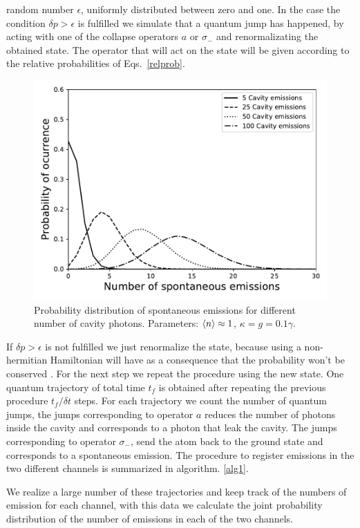 \documentclass[%
 reprint,
 amsmath,amssymb,
 aps, 
]{revtex4-1}
\begin{document}
random number $\epsilon$, uniformly distributed between zero and one.
In the case the condition $\delta p > \epsilon$ is fulfilled we
simulate that a quantum jump has happened, by acting with one of the
collapse operators $a$ or $\sigma_-$ and renormalizating the obtained
state. The operator that will act on the state will be given according
to the relative probabilities of Eqs.~\eqref{relprob}.
\begin{figure}[!t] 
\centering
\includegraphics[scale = 0.5]{distributioneng.pdf}
\caption{Probability distribution of spontaneous emissions for
  different number of cavity photons. Parameters: $\expval{n} \approx 1$, $\kappa = g = 0.1\gamma$. } \label{probdiss}
\end{figure}
If $\delta p > \epsilon$ is not fulfilled we just renormalize the
state, because using a non-hermitian Hamiltonian will have as a
consequence that the probability won't be conserved
\cite{Sakurai:1167961}. For the next step we repeat the procedure
using the new state. One quantum trajectory of total time $t_f$ is
obtained after repeating the previous procedure $t_f/\delta t$ steps.
For each trajectory we count the number of quantum jumps, the jumps
corresponding to operator $a$ reduces the number of photons inside the
cavity and corresponds to a photon that leak the cavity. The jumps
corresponding to operator $\sigma_-$, send the atom back to the ground
state and corresponds to a spontaneous emission. The procedure to
register emissions in the two different channels is summarized in
algorithm. \ref{alg1}.

We realize a large number of these trajectories and keep track of the
numbers of emission for each channel, with this data we calculate
the joint probability distribution of the number of emissions in each
of the two channels.
\end{document}
